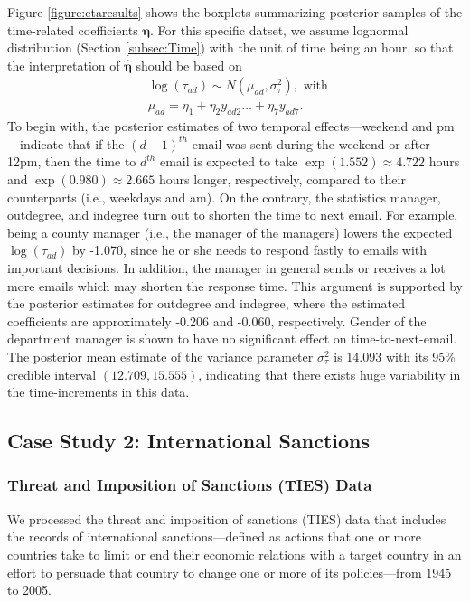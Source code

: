 \documentclass[12pt]{article}
\begin{document}
	Figure \ref{figure:etaresults} shows the boxplots summarizing posterior samples of the time-related coefficients $\boldsymbol{\eta}$. For this specific datset, we assume lognormal distribution (Section \ref{subsec:Time}) with the unit of time being an hour, so that the interpretation of $\hat{\boldsymbol{\eta}}$ should be based on
\begin{equation*}
\begin{aligned}
&\log(\tau_{ad}) \sim N(\mu_{ad}, \sigma_\tau^2), \mbox{ with }\\
&\mu_{ad} = \eta_{1}+\eta_{2} y_{ad2}\ldots+\eta_{7}y_{ad7}.
\end{aligned}
\end{equation*}
To begin with, the posterior estimates of two temporal effects---weekend and pm---indicate that if the ${(d-1)}^{th}$ email was sent during the weekend or after 12pm, then the time to $d^{th}$ email is expected to take $\exp(1.552)\approx 4.722$ hours and $\exp(0.980)\approx2.665$ hours longer, respectively, compared to their counterparts (i.e., weekdays and am). On the contrary, the statistics manager, outdegree, and indegree turn out to shorten the time to next email. For example, being a county manager (i.e., the manager of the managers) lowers the expected $\log(\tau_{ad})$ by -1.070, since he or she needs to respond fastly to emails with important decisions. In addition, the manager in general sends or receives a lot more emails which may shorten the response time. This argument is supported by the posterior estimates for outdegree and indegree, where the estimated coefficients are approximately -0.206 and -0.060, respectively. Gender of the department manager is shown to have no significant effect on time-to-next-email. The posterior mean estimate of the variance parameter $\sigma^2_\tau$ is 14.093 with its 95\% credible interval $(12.709, 15.555)$, indicating that there exists huge variability in the time-increments in this data.


\iffalse
\subsection{Case Study 2: International Sanctions}\label{subsec:International Sanctions}
\subsubsection{Threat and Imposition of Sanctions (TIES) Data}\label{subsubsec:TIES}
We processed the threat and imposition of sanctions (TIES) data \citep{morgan2014threat} that includes the records of international sanctions---defined as actions that one or more countries take to limit or end their economic relations with a target country in an effort to persuade that country to change one or more of its policies---from 1945 to 2005.
\end{document}
